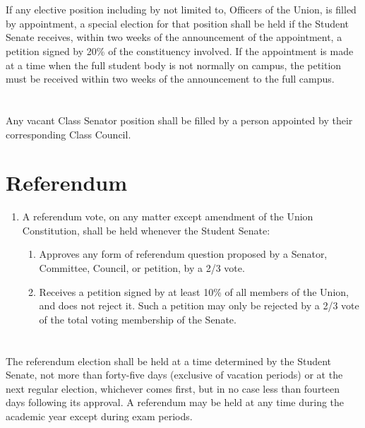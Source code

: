 \documentclass{uniondoc}
\begin{document}
\section{}

If any elective position including by not limited to, Officers of the Union, is filled by appointment, a special election for that position shall be held if the Student Senate receives, within two weeks of the announcement of the appointment, a petition signed by 20\% of the constituency involved. If the appointment is made at a time when the full student body is not normally on campus, the petition must be received within two weeks of the announcement to the full campus.

\section{}

Any vacant Class Senator position shall be filled by a person appointed by their corresponding Class Council.


\section{Referendum}

\begin{enumerate}
\item A referendum vote, on any matter except amendment of the Union Constitution, shall be held whenever the Student Senate:
  \begin{enumerate}
  \item Approves any form of referendum question proposed by a Senator, Committee, Council, or petition, by a 2/3 vote.
  \item Receives a petition signed by at least 10\% of all members of the Union, and does not reject it. Such a petition may only be rejected by a 2/3 vote of the total voting membership of the Senate.
  \end{enumerate}
\end{enumerate}

\section{}

The referendum election shall be held at a time determined by the Student Senate, not more than forty-five days (exclusive of vacation periods) or at the next regular election, whichever comes first, but in no case less than fourteen days following its approval. A referendum may be held at any time during the academic year except during exam periods.
\end{document}
